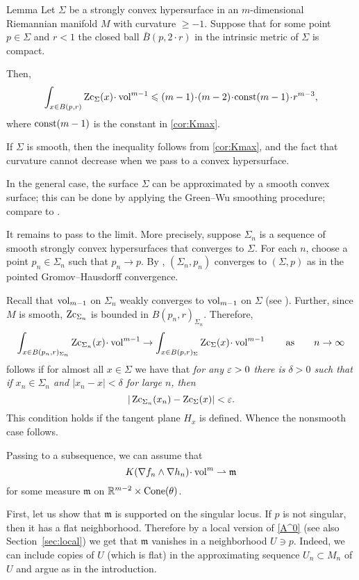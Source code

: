 \begin{thm}{Lemma}\label{lem:nonsmooth-convex}
Let $\Sigma$ be a strongly convex hypersurface in an $m$-dimensional Riemannian manifold $M$ with curvature $\ge -1$.
Suppose that for some point $p\in \Sigma$ and $r<1$ the closed ball $\bar B(p,2\cdot r)$ in the intrinsic metric of $\Sigma$ is compact.

Then, 
\[\int_{x\in B(p,r)}\Zc_\Sigma(x)\cdot \vol^{m-1}\le (m-1)\cdot(m-2)\cdot\const(m-1)\cdot r^{m-3},\]
where $\mathrm{const}(m-1)$ is the constant in \ref{cor:Kmax}.
\end{thm}

 If $\Sigma$ is smooth, then the inequality follows from \ref{cor:Kmax}, and the fact that curvature cannot decrease when we pass to a convex hypersurface.

In the general case, the surface $\Sigma$ can be approximated by a smooth convex surface;
this can be done by applying the Green--Wu smoothing procedure; compare to \cite{AKP-buyalo}.

It remains to pass to the limit.
More precisely, suppose $\Sigma_n$ is a sequence of smooth  strongly convex hypersurfaces that converges to $\Sigma$.
For each $n$, choose a point $p_n\in\Sigma_n$ such that $p_n\to p$. 
By \cite[Theorem 1.2]{petrunin-QG}, $(\Sigma_n,p_n)$ converges to $(\Sigma,p)$ as in the pointed Gromov--Hausdorff convergence.

Recall that $\operatorname{vol}_{m-1}$ on $\Sigma_n$ weakly converges to $\operatorname{vol}_{m-1}$ on $\Sigma$ (see \cite[10.8]{BGP}).
Further, since $M$ is smooth, $\operatorname{\rm Zc}_{\Sigma_n}$ is bounded in $B(p_n,r)_{\Sigma_n}$.
Therefore, 
\[\int_{x\in B(p_n,r)_{\Sigma_n}}\Zc_{\Sigma_n}(x)\cdot \vol^{m-1}\to \int_{x\in B(p,r)_{\Sigma}}\Zc_{\Sigma}(x)\cdot \vol^{m-1}\qquad\text{as}\qquad n\to\infty\]
follows if for almost all $x\in \Sigma$ we have that
\textit{for any $\varepsilon>0$ there is $\delta>0$ such that
if $x_n\in \Sigma_n$ and $|x_n-x|<\delta$ for large $n$,
then}
\[|\operatorname{\rm Zc}_{\Sigma_n}(x_n)-\operatorname{\rm Zc}_{\Sigma}(x)|<\varepsilon.\]
This condition holds if the tangent plane $H_x$ is defined.
Whence the nonsmooth case follows.
\qeds

Passing to a subsequence, we can assume that
\[K(\nabla f_n\wedge\nabla h_n)\cdot\vol^m \rightharpoonup\mathfrak m\]
for some measure $\mathfrak m$ on $\mathbb{R}^{m-2}\times \operatorname{Cone}(\theta)$.

First, let us show that $\mathfrak m$ is supported on the singular locus.
If $p$ is not singular, then it has a flat neighborhood.
Therefore by a local version of \ref{A^0} (see also Section~\ref{sec:local})
we get that $\mathfrak m$ vanishes in a neighborhood $U\ni p$.
Indeed, we can include copies of $U$ (which is flat) in the approximating sequence $U_n\subset M_n$ of $U$ and argue as in the introduction.


